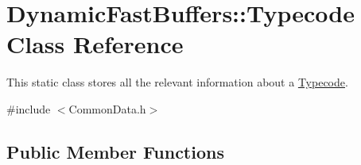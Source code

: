 \hypertarget{class_dynamic_fast_buffers_1_1_typecode}{\section{Dynamic\-Fast\-Buffers\-:\-:Typecode Class Reference}
\label{class_dynamic_fast_buffers_1_1_typecode}
}


This static class stores all the relevant information about a \hyperlink{class_dynamic_fast_buffers_1_1_typecode}{Typecode}.  




{\ttfamily \#include $<$Common\-Data.\-h$>$}

\subsection*{Public Member Functions}
